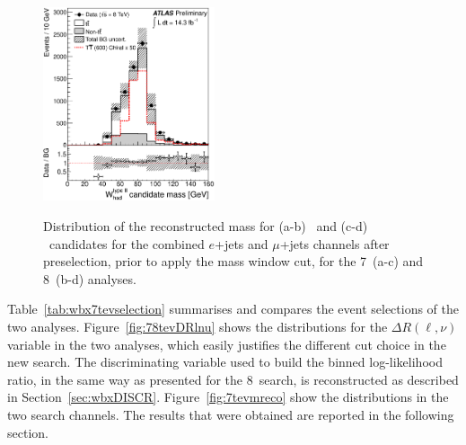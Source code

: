 \begin{figure}[h!tb]
\begin{center}
{                \includegraphics[width=0.45\textwidth]{wbx_analysis_14ifb/figures/confnoteplots/VLQAna_WbX_WpreselType2_M_ELEMUON_preselW_NOMINAL.eps}}
	\caption[bla]{Distribution of the reconstructed mass for 
        (a-b) \wi\ and (c-d) \wii\ candidates
        for the combined $e$+jets and $\mu$+jets channels after preselection,
        prior to apply the mass window cut, for the 7\tev\ (a-c) and 8\tev\ (b-d) analyses.
        \label{fig:7tevmwhad}}
\end{center}\end{figure}

Table~\ref{tab:wbx7tevselection} summarises and compares the event selections
of the two analyses. Figure~\ref{fig:78tevDRlnu} shows the
distributions for the $\Delta R(\ell,\nu)$ variable in the
two analyses, which easily justifies the different cut choice
in the new search. The discriminating variable used 
to build the binned log-likelihood ratio, in the same 
way as presented for the 8\tev\ search, is reconstructed
as described in Section~\ref{sec:wbxDISCR}. Figure~\ref{fig:7tevmreco}
show the distributions in the two search channels.
The results that were obtained are reported in the following section.

